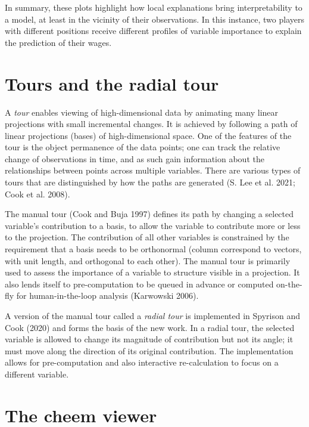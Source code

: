 \documentclass[
]{article}
\begin{document}
In summary, these plots highlight how local explanations bring interpretability to a model, at least in the vicinity of their observations. In this instance, two players with different positions receive different profiles of variable importance to explain the prediction of their wages.

\hypertarget{tours-and-the-radial-tour}{%
\section{Tours and the radial tour}\label{tours-and-the-radial-tour}}

A \emph{tour} enables viewing of high-dimensional data by animating many linear projections with small incremental changes. It is achieved by following a path of linear projections (bases) of high-dimensional space. One of the features of the tour is the object permanence of the data points; one can track the relative change of observations in time, and as such gain information about the relationships between points across multiple variables. There are various types of tours that are distinguished by how the paths are generated (S. Lee et al. 2021; Cook et al. 2008).

The manual tour (Cook and Buja 1997) defines its path by changing a selected variable's contribution to a basis, to allow the variable to contribute more or less to the projection. The contribution of all other variables is constrained by the requirement that a basis needs to be orthonormal (column correspond to vectors, with unit length, and orthogonal to each other). The manual tour is primarily used to assess the importance of a variable to structure visible in a projection. It also lends itself to pre-computation to be queued in advance or computed on-the-fly for human-in-the-loop analysis (Karwowski 2006).

A version of the manual tour called a \emph{radial tour} is implemented in Spyrison and Cook (2020) and forms the basis of the new work. In a radial tour, the selected variable is allowed to change its magnitude of contribution but not its angle; it must move along the direction of its original contribution. The implementation allows for pre-computation and also interactive re-calculation to focus on a different variable.

\hypertarget{sec:applicationdesign}{%
\section{The cheem viewer}\label{sec:applicationdesign}}
\end{document}
